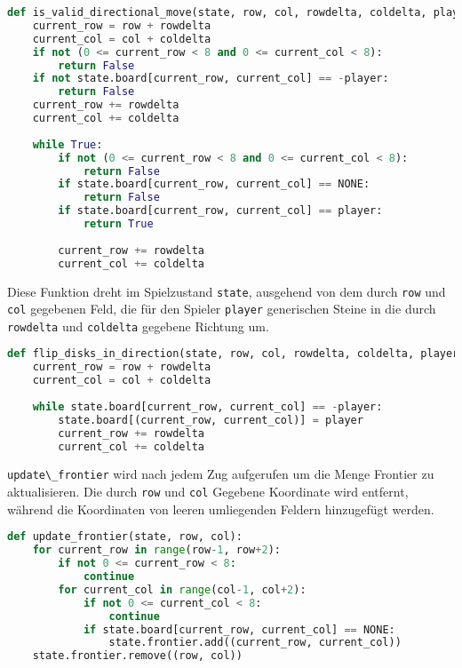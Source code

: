 \begin{lstlisting}[language=Python]
def is_valid_directional_move(state, row, col, rowdelta, coldelta, player):
    current_row = row + rowdelta
    current_col = col + coldelta
    if not (0 <= current_row < 8 and 0 <= current_col < 8):
        return False
    if not state.board[current_row, current_col] == -player:
        return False
    current_row += rowdelta
    current_col += coldelta
    
    while True:
        if not (0 <= current_row < 8 and 0 <= current_col < 8):
            return False
        if state.board[current_row, current_col] == NONE:
            return False           
        if state.board[current_row, current_col] == player:
            return True
    
        current_row += rowdelta
        current_col += coldelta
\end{lstlisting}

Diese Funktion dreht im Spielzustand \passthrough{\lstinline!state!},
ausgehend von dem durch \passthrough{\lstinline!row!} und
\passthrough{\lstinline!col!} gegebenen Feld, die für den Spieler
\passthrough{\lstinline!player!} generischen Steine in die durch
\passthrough{\lstinline!rowdelta!} und
\passthrough{\lstinline!coldelta!} gegebene Richtung um.

\begin{lstlisting}[language=Python]
def flip_disks_in_direction(state, row, col, rowdelta, coldelta, player):
    current_row = row + rowdelta
    current_col = col + coldelta
    
    while state.board[current_row, current_col] == -player:
        state.board[(current_row, current_col)] = player
        current_row += rowdelta
        current_col += coldelta
\end{lstlisting}

\passthrough{\lstinline!update\_frontier!} wird nach jedem Zug
aufgerufen um die Menge Frontier zu aktualisieren. Die durch
\passthrough{\lstinline!row!} und \passthrough{\lstinline!col!} Gegebene
Koordinate wird entfernt, während die Koordinaten von leeren umliegenden
Feldern hinzugefügt werden.

\begin{lstlisting}[language=Python]
def update_frontier(state, row, col):
    for current_row in range(row-1, row+2):
        if not 0 <= current_row < 8:
            continue
        for current_col in range(col-1, col+2):
            if not 0 <= current_col < 8:
                continue
            if state.board[current_row, current_col] == NONE:
                state.frontier.add((current_row, current_col))
    state.frontier.remove((row, col))
\end{lstlisting}

